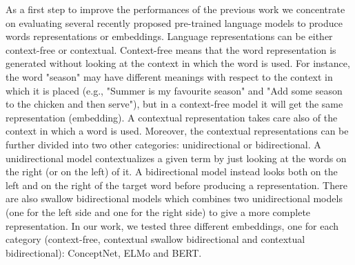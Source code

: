 \documentclass[11pt,a4paper]{article}
\begin{document}
As a first step to improve the performances of the previous work we concentrate on evaluating several recently proposed pre-trained language models to produce words representations or embeddings. Language representations can be either context-free or contextual. 
Context-free means that the word representation is generated without looking at the context in which the word is used. For instance, the word "season" may have different meanings with respect to the context in which it is placed (e.g., "Summer is my favourite season" and "Add some season to the chicken and then serve"), but in a context-free model it will get the same representation (embedding). A contextual representation takes care also of the context in which a word is used.
Moreover, the contextual representations can be further divided into two other categories: unidirectional or bidirectional. 
A unidirectional model contextualizes a given term by just looking at the words on the right (or on the left) of it.  A bidirectional model instead looks both on the left and on the right of the target word before producing a representation. There are also swallow bidirectional models which combines two unidirectional models (one for the left side and one for the right side) to give a more complete representation. In our work, we tested three different embeddings, one for each category (context-free, contextual swallow bidirectional and contextual bidirectional): ConceptNet, ELMo and BERT.
\end{document}
